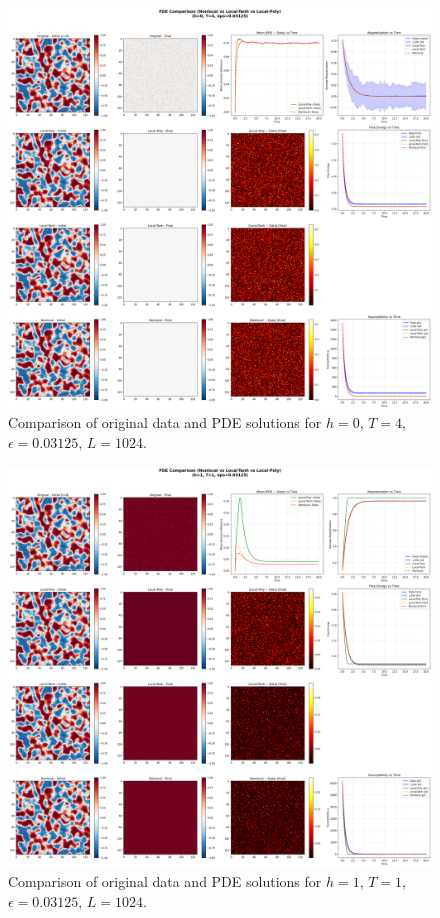 \documentclass[11pt,a4paper]{article}
\begin{document}
\begin{figure}[h]
    \centering
    \includegraphics[width=1.0\textwidth]{fig/compare_pde_solvers_L1024_h0_T4_eps0.03125.png}
    \caption{Comparison of original data and PDE solutions for $h=0$, $T=4$, $\epsilon=0.03125$, $L=1024$.}
    \label{fig:pde_comparison_h0_T4_eps0.03125}
\end{figure}


\begin{figure}[!h]
    \centering
    \includegraphics[width=1.0\textwidth]{fig/compare_pde_solvers_L1024_h1_T1_eps0.03125.png}
    \caption{Comparison of original data and PDE solutions for $h=1$, $T=1$, $\epsilon=0.03125$, $L=1024$.}
    \label{fig:pde_comparison_h1_T1_eps0.03125}
\end{figure}
\end{document}
